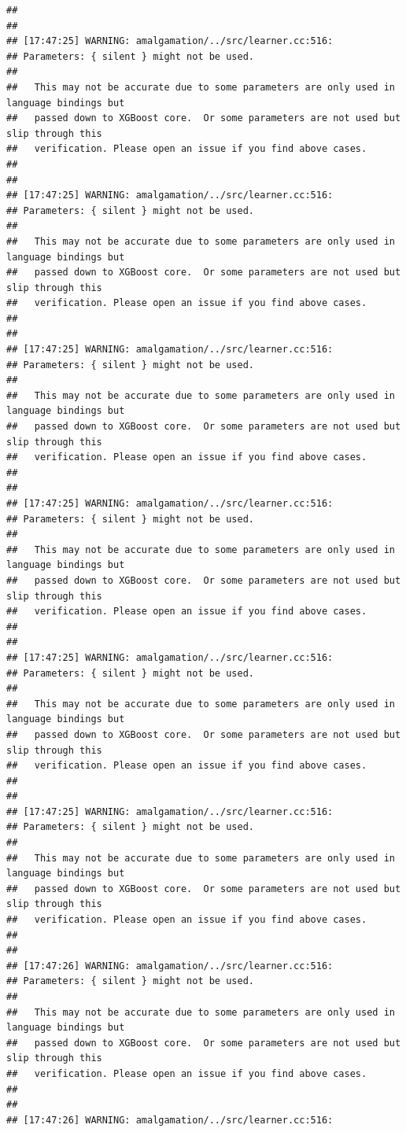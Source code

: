 \documentclass[AMS,STIX2COL]{WileyNJD-v2}\usepackage[]{graphicx}\usepackage[]{color}
\makeatletter
\newenvironment{kframe}{%
 \def\at@end@of@kframe{}%
 \ifinner\ifhmode%
  \def\at@end@of@kframe{\end{minipage}}%
  \begin{minipage}{\columnwidth}%
 \fi\fi%
 \def\FrameCommand##1{\hskip\@totalleftmargin \hskip-\fboxsep
 \colorbox{shadecolor}{##1}\hskip-\fboxsep
     \hskip-\linewidth \hskip-\@totalleftmargin \hskip\columnwidth}%
 \MakeFramed {\advance\hsize-\width
   \@totalleftmargin\z@ \linewidth\hsize
   \@setminipage}}%
 {\par\unskip\endMakeFramed%
 \at@end@of@kframe}
\newenvironment{knitrout}{}{} %
\makeatother
\begin{document}
\begin{knitrout}
\begin{kframe}
\begin{verbatim}
## 
## 
## [17:47:25] WARNING: amalgamation/../src/learner.cc:516: 
## Parameters: { silent } might not be used.
## 
##   This may not be accurate due to some parameters are only used in language bindings but
##   passed down to XGBoost core.  Or some parameters are not used but slip through this
##   verification. Please open an issue if you find above cases.
## 
## 
## [17:47:25] WARNING: amalgamation/../src/learner.cc:516: 
## Parameters: { silent } might not be used.
## 
##   This may not be accurate due to some parameters are only used in language bindings but
##   passed down to XGBoost core.  Or some parameters are not used but slip through this
##   verification. Please open an issue if you find above cases.
## 
## 
## [17:47:25] WARNING: amalgamation/../src/learner.cc:516: 
## Parameters: { silent } might not be used.
## 
##   This may not be accurate due to some parameters are only used in language bindings but
##   passed down to XGBoost core.  Or some parameters are not used but slip through this
##   verification. Please open an issue if you find above cases.
## 
## 
## [17:47:25] WARNING: amalgamation/../src/learner.cc:516: 
## Parameters: { silent } might not be used.
## 
##   This may not be accurate due to some parameters are only used in language bindings but
##   passed down to XGBoost core.  Or some parameters are not used but slip through this
##   verification. Please open an issue if you find above cases.
## 
## 
## [17:47:25] WARNING: amalgamation/../src/learner.cc:516: 
## Parameters: { silent } might not be used.
## 
##   This may not be accurate due to some parameters are only used in language bindings but
##   passed down to XGBoost core.  Or some parameters are not used but slip through this
##   verification. Please open an issue if you find above cases.
## 
## 
## [17:47:25] WARNING: amalgamation/../src/learner.cc:516: 
## Parameters: { silent } might not be used.
## 
##   This may not be accurate due to some parameters are only used in language bindings but
##   passed down to XGBoost core.  Or some parameters are not used but slip through this
##   verification. Please open an issue if you find above cases.
## 
## 
## [17:47:26] WARNING: amalgamation/../src/learner.cc:516: 
## Parameters: { silent } might not be used.
## 
##   This may not be accurate due to some parameters are only used in language bindings but
##   passed down to XGBoost core.  Or some parameters are not used but slip through this
##   verification. Please open an issue if you find above cases.
## 
## 
## [17:47:26] WARNING: amalgamation/../src/learner.cc:516: 

\end{verbatim}
\end{kframe}
\end{knitrout}
\end{document}
